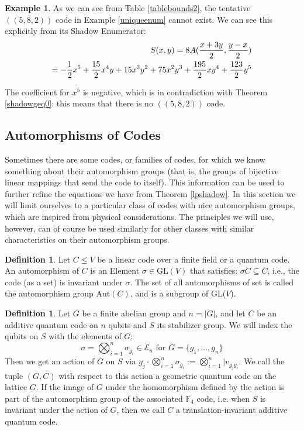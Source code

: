 \documentclass[12pt,a4paper,BCOR15mm,twoside,DIV12]{article}
\def\E{\mathcal{E}}
\def\F{\mathbb{F}}
\theoremstyle{definition}
\newtheorem{ex}[Satz]{Example}
\newtheorem{defn}[Satz]{Definition}
\begin{document}
\begin{ex}
As we can see from Table \ref{tablebounds2}, the tentative $((5,8,2))$ code in Example \ref{uniqueenum} cannot exist. We can see this explicitly from its Shadow Enumerator:
\begin{align}
S(x,y) = 8 A(\frac{x+3y}{2},\frac{y-x}{2}) \notag \\
= -\frac{1}{2} x^5+ \frac{15}{2}x^4y + 15 x^3 y^2 + 75 x^2 y^3 + \frac{195}{2} x y^4 +\frac{123}{2} y^5
\end{align}

The coefficient for $x^5$ is negative, which is in contradiction with Theorem \ref{shadowgeq0}: this means that there is no $((5,8,2))$ code.
\end{ex}

\subsection{Automorphisms of Codes}

Sometimes there are some codes, or families of codes, for which we know something about their automorphism groups (that is, the groups of bijective linear mappings that send the code to itself). 
This information can be used to further refine the equations we have from Theorem \ref{lpshadow}. In this section we will limit ourselves to a particular class of codes with nice automorphism groups, which are inspired
from physical considerations. The principles we will use, however, can of course be used similarly for other classes with similar characteristics on their automorphism groups.

\begin{defn}
Let $C \leq V$ be a linear code over a finite field or a quantum code. An automorphism of $C$ is an Element $\sigma \in \text{GL}(V)$ that satisfies:
$\sigma C \subseteq C$, i.e., the code (as a set) is invariant under $\sigma$. The set of all automorphisms of set is called the automorphism group $\text{Aut}(C)$, and is a subgroup of GL($V$).
\end{defn}

\begin{defn}\label{geometriccodes}
Let $G$ be a finite abelian group and $n = |G|$, and let $C$ be an additive quantum code on $n$ qubits and $S$ its stabilizer group. We will index the qubits on $S$ with the elements of $G$: \[ \sigma  = \bigotimes_{i = 1}^n \sigma_{g_i} \in \E_n \text{ for } G = \{ g_1, \ldots, g_n \} \]
Then we get an action of $G$ on $S$ via $g_j \cdot \bigotimes_{i= 1}^n \sigma_{g_i} := \bigotimes_{i = 1}^n |v_{g_j g_i}$.
We call the tuple $(G,C)$ with respect to this action a geometric quantum code on the lattice $G$. If the image of $G$ under the homomorphism defined by the action is part of the automorphism group of the associated $\F_4$ code, i.e. when $S$ is invariant under the action of $G$, then we call $C$ a translation-invariant additive quantum code.

\end{defn}
\end{document}
